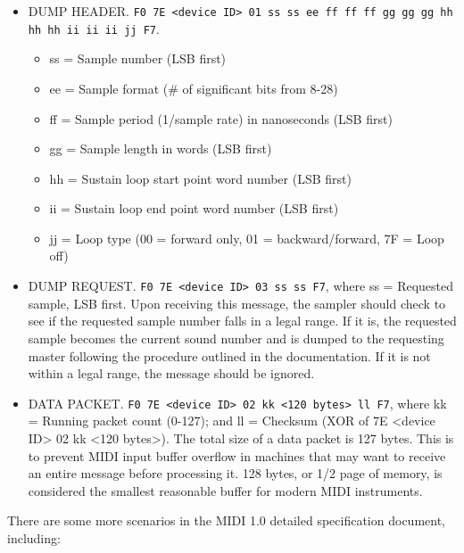    \begin{itemize}
      \item DUMP HEADER.
         \texttt{F0 7E <device ID> 01 ss ss ee ff ff ff
            gg gg gg hh hh hh ii ii ii jj F7}.
         \begin{itemize}
            \item ss = Sample number (LSB first)
            \item ee = Sample format (# of significant bits from 8-28)
            \item ff = Sample period (1/sample rate) in nanoseconds (LSB first)
            \item gg = Sample length in words (LSB first)
            \item hh = Sustain loop start point word number (LSB first)
            \item ii = Sustain loop end point word number (LSB first)
            \item jj = Loop type (00 = forward only, 01 = backward/forward,
               7F = Loop off)
         \end{itemize}
      \item DUMP REQUEST.
         \texttt{F0 7E <device ID> 03 ss ss F7}, where ss =
         Requested sample, LSB first.
         Upon receiving this message, the sampler should check to see if the
         requested sample number falls in a legal range.
         If it is, the requested sample becomes the current sound
         number and is dumped to the requesting master following the
         procedure outlined in the documentation.
         If it is not within a legal range, the message should be ignored.
      \item DATA PACKET.
         \texttt{F0 7E <device ID> 02 kk <120 bytes> ll F7}, where
         kk = Running packet count (0-127); and
         ll = Checksum (XOR of 7E <device ID> 02 kk <120 bytes>).
      The total size of a data packet is 127 bytes. This is to prevent MIDI
      input buffer overflow in machines that may want to receive an
      entire message before processing it. 128
      bytes, or 1/2 page of memory, is
      considered the smallest reasonable buffer for modern MIDI instruments.
   \end{itemize}

   There are some more scenarios in the MIDI 1.0 detailed specification
   document, including:


